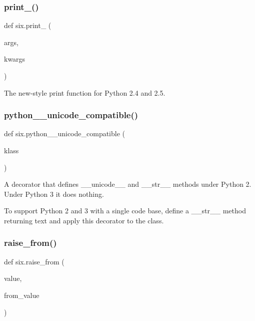 \mbox{\label{namespacesix_ad04fa7d5b6867bc3d14c6cac60116ced}} 
\subsubsection{\texorpdfstring{print\+\_\+()}{print\_()}}
{\footnotesize\ttfamily def six.\+print\+\_\+ (\begin{DoxyParamCaption}\item[{}]{args,  }\item[{}]{kwargs }\end{DoxyParamCaption})}

\begin{DoxyVerb}The new-style print function for Python 2.4 and 2.5.\end{DoxyVerb}
 \mbox{\label{namespacesix_a341d28e4b5838a614702f1b01b9ce39d}} 
\subsubsection{\texorpdfstring{python\+\_\+\_\+unicode\+\_\+compatible()}{python\_2\_unicode\_compatible()}}
{\footnotesize\ttfamily def six.\+python\+\_\+\_\+unicode\+\_\+compatible (\begin{DoxyParamCaption}\item[{}]{klass }\end{DoxyParamCaption})}

\begin{DoxyVerb}A decorator that defines __unicode__ and __str__ methods under Python 2.
Under Python 3 it does nothing.

To support Python 2 and 3 with a single code base, define a __str__ method
returning text and apply this decorator to the class.
\end{DoxyVerb}
 \mbox{\label{namespacesix_a5321131a67ed38a6ffef95beebc1c334}} 
\subsubsection{\texorpdfstring{raise\+\_\+from()}{raise\_from()}}
{\footnotesize\ttfamily def six.\+raise\+\_\+from (\begin{DoxyParamCaption}\item[{}]{value,  }\item[{}]{from\+\_\+value }\end{DoxyParamCaption})}

